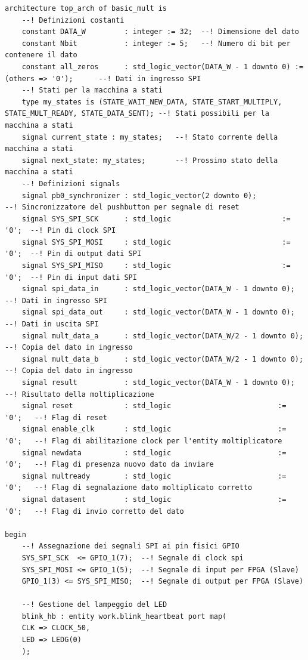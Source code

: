 \documentclass[titlepage]{report}
\begin{document}
\begin{lstlisting}[caption={Top level implementato per la nostra architettura}, label={lst:mul16_process}]
architecture top_arch of basic_mult is
	--! Definizioni costanti
	constant DATA_W         : integer := 32;  --! Dimensione del dato
	constant Nbit           : integer := 5;   --! Numero di bit per contenere il dato
	constant all_zeros      : std_logic_vector(DATA_W - 1 downto 0) := (others => '0');      --! Dati in ingresso SPI
	--! Stati per la macchina a stati
	type my_states is (STATE_WAIT_NEW_DATA, STATE_START_MULTIPLY, STATE_MULT_READY, STATE_DATA_SENT); --! Stati possibili per la macchina a stati
	signal current_state : my_states;   --! Stato corrente della macchina a stati
	signal next_state: my_states;       --! Prossimo stato della macchina a stati
	--! Definizioni signals
	signal pb0_synchronizer : std_logic_vector(2 downto 0);               --! Sincronizzatore del pushbutton per segnale di reset
	signal SYS_SPI_SCK      : std_logic                          := '0';  --! Pin di clock SPI
	signal SYS_SPI_MOSI     : std_logic                          := '0';  --! Pin di output dati SPI
	signal SYS_SPI_MISO     : std_logic                          := '0';  --! Pin di input dati SPI
	signal spi_data_in      : std_logic_vector(DATA_W - 1 downto 0);      --! Dati in ingresso SPI
	signal spi_data_out     : std_logic_vector(DATA_W - 1 downto 0);      --! Dati in uscita SPI
	signal mult_data_a      : std_logic_vector(DATA_W/2 - 1 downto 0);    --! Copia del dato in ingresso
	signal mult_data_b      : std_logic_vector(DATA_W/2 - 1 downto 0);    --! Copia del dato in ingresso
	signal result           : std_logic_vector(DATA_W - 1 downto 0);      --! Risultato della moltiplicazione
	signal reset            : std_logic                         := '0';   --! Flag di reset
	signal enable_clk       : std_logic                         := '0';   --! Flag di abilitazione clock per l'entity moltiplicatore
	signal newdata          : std_logic                         := '0';   --! Flag di presenza nuovo dato da inviare
	signal multready        : std_logic                         := '0';   --! Flag di segnalazione dato moltiplicato corretto
	signal datasent         : std_logic                         := '0';   --! Flag di invio corretto del dato

begin
	--! Assegnazione dei segnali SPI ai pin fisici GPIO
	SYS_SPI_SCK  <= GPIO_1(7);  --! Segnale di clock spi
	SYS_SPI_MOSI <= GPIO_1(5);  --! Segnale di input per FPGA (Slave)
	GPIO_1(3) <= SYS_SPI_MISO;  --! Segnale di output per FPGA (Slave)
	
	--! Gestione del lampeggio del LED 
	blink_hb : entity work.blink_heartbeat port map(
	CLK => CLOCK_50,
	LED => LEDG(0)
	);


\end{lstlisting}
\end{document}
